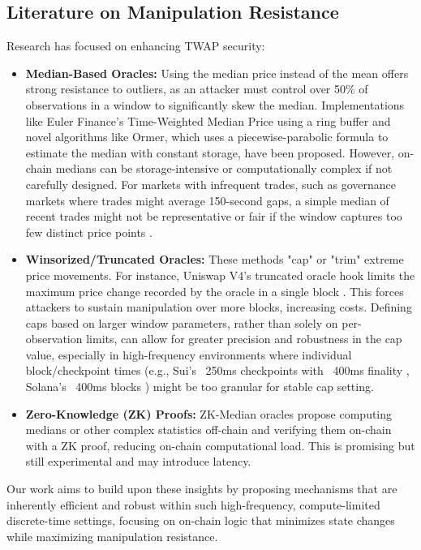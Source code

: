 \documentclass{article}
\begin{document}
\subsection{Literature on Manipulation Resistance}
Research has focused on enhancing TWAP security:
\begin{itemize}
    \item \textbf{Median-Based Oracles:} Using the median price instead of the mean offers strong resistance to outliers, as an attacker must control over 50\% of observations in a window to significantly skew the median. Implementations like Euler Finance's Time-Weighted Median Price using a ring buffer and novel algorithms like Ormer, which uses a piecewise-parabolic formula to estimate the median with constant storage, have been proposed. \cite{omer} However, on-chain medians can be storage-intensive or computationally complex if not carefully designed. For markets with infrequent trades, such as governance markets where trades might average 150-second gaps, a simple median of recent trades might not be representative or fair if the window captures too few distinct price points \cite{trades}.
    \item \textbf{Winsorized/Truncated Oracles:} These methods "cap" or "trim" extreme price movements. For instance, Uniswap V4's truncated oracle hook limits the maximum price change recorded by the oracle in a single block \cite{uniswapv4}. This forces attackers to sustain manipulation over more blocks, increasing costs. Defining caps based on larger window parameters, rather than solely on per-observation limits, can allow for greater precision and robustness in the cap value, especially in high-frequency environments where individual block/checkpoint times (e.g., Sui's ~250ms checkpoints with ~400ms finality \cite{suiblog}, Solana's ~400ms blocks \cite{solblocks}) might be too granular for stable cap setting.
    \item \textbf{Zero-Knowledge (ZK) Proofs:} ZK-Median oracles propose computing medians or other complex statistics off-chain and verifying them on-chain with a ZK proof, reducing on-chain computational load. This is promising but still experimental and may introduce latency.
\end{itemize}

Our work aims to build upon these insights by proposing mechanisms that are inherently efficient and robust within such high-frequency, compute-limited discrete-time settings, focusing on on-chain logic that minimizes state changes while maximizing manipulation resistance.
\end{document}
